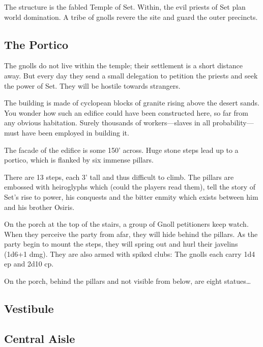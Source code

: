\documentclass[a4paper,serif]{module}
\begin{document}
The structure is the fabled Temple of Set. Within, the evil priests of Set plan world domination.
A tribe of gnolls revere the site and guard the outer precincts.

\subsection{The Portico} %
\label{portico}

The gnolls do not live within the temple; their settlement is a short distance away. But every day they
send a small delegation to petition the priests and seek the power of Set. They will be hostile towards
strangers.

\begin{boxtext}
The building is made of cyclopean blocks of granite rising above the desert sands. You wonder how such
an edifice could have been constructed here, so far from any obvious habitation. Surely thousands of
workers---slaves in all probability---must have been employed in building it.

The facade of the edifice is some 150' across. Huge stone steps lead up to a portico, which is flanked
by six immense pillars.
\end{boxtext}

There are 13 steps, each 3' tall and thus difficult to climb. The pillars are embossed with heiroglyphs
which (could the players read them), tell the story of Set's rise to power, his conquests and the
bitter enmity which exists between him and his brother Osiris.

On the porch at the top of the stairs, a group of Gnoll petitioners keep watch. When they perceive
the party from afar, they will hide behind the pillars. As the party begin to mount the steps, they will
spring out and hurl their javelins (1d6+1 dmg). They are also armed with spiked clubs:
The gnolls each carry 1d4 ep and 2d10 cp.

On the porch, behind the pillars and not visible from below, are eight statues\ldots

\subsection{Vestibule} %

\begin{boxtext}
\lipsum[1]
\end{boxtext}

\lipsum[2]

\subsection{Central Aisle} %
\end{document}
